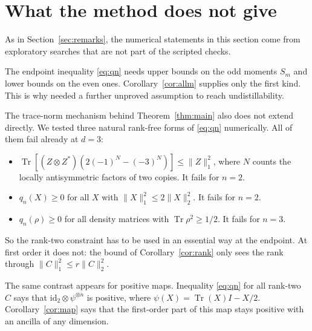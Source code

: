 \documentclass[11pt]{article}
\theoremstyle{remark}
\newcommand{\Tr}{\operatorname{Tr}}
\newcommand{\norm}[1]{\lVert #1\rVert}
\begin{document}
\section{What the method does not give}
As in Section~\ref{sec:remarks}, the numerical statements in this section come from exploratory searches that are not part of the scripted checks.


The endpoint inequality \eqref{eq:qn} needs upper bounds on the odd moments $S_m$ and lower bounds on the even ones.
Corollary~\ref{cor:allm} supplies only the first kind. This is why \cite{CS} needed a further unproved assumption to
reach undistillability.

The trace-norm mechanism behind Theorem~\ref{thm:main} also does not extend directly. We tested three natural rank-free
forms of \eqref{eq:qn} numerically. All of them fail already at $d=3$:
\begin{itemize}
\item $\Tr[(Z\otimes Z^*)(2(-1)^N-(-3)^N)]\le\norm{Z}_1^2$, where $N$ counts the locally antisymmetric factors of two
copies. It fails for $n=2$.
\item $q_n(X)\ge0$ for all $X$ with $\norm{X}_1^2\le2\norm{X}_2^2$. It fails for $n=2$.
\item $q_n(\rho)\ge0$ for all density matrices with $\Tr\rho^2\ge1/2$. It fails for $n=3$.
\end{itemize}
So the rank-two constraint has to be used in an essential way at the endpoint. At first order it does not: the bound of
Corollary~\ref{cor:rank} only sees the rank through $\norm{C}_1^2\le r\norm{C}_2^2$.

The same contrast appears for positive maps. Inequality \eqref{eq:qn} for all rank-two $C$ says that
$\mathrm{id}_2\otimes\psi^{\otimes n}$ is positive, where $\psi(X)=\Tr(X)I-X/2$. Corollary~\ref{cor:map} says that the
first-order part of this map stays positive with an ancilla of any dimension.
\end{document}
